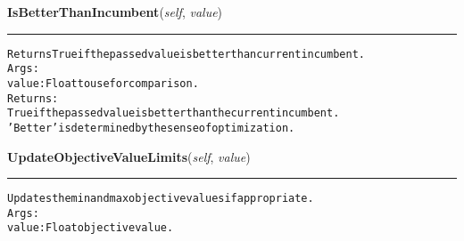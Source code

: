    \label{coinor:grumpy:BB:BBTree:IsBetterThanIncumbent}

    \vspace{0.5ex}

\hspace{.8\funcindent}\begin{boxedminipage}{\funcwidth}

    \raggedright \textbf{IsBetterThanIncumbent}(\textit{self}, \textit{value})

    \vspace{-1.5ex}

    \rule{\textwidth}{0.5\fboxrule}
\setlength{\parskip}{2ex}
\begin{alltt}

Returns True if the passed value is better than current incumbent.
Args:
  value: Float to use for comparison.
Returns:
  True if the passed value is better than the current incumbent.
  'Better' is determined by the sense of optimization.
\end{alltt}

\setlength{\parskip}{1ex}
    \end{boxedminipage}

    \label{coinor:grumpy:BB:BBTree:UpdateObjectiveValueLimits}

    \vspace{0.5ex}

\hspace{.8\funcindent}\begin{boxedminipage}{\funcwidth}

    \raggedright \textbf{UpdateObjectiveValueLimits}(\textit{self}, \textit{value})

    \vspace{-1.5ex}

    \rule{\textwidth}{0.5\fboxrule}
\setlength{\parskip}{2ex}
\begin{alltt}
Updates the min and max objective values if appropriate.
Args:
  value: Float objective value.
\end{alltt}

\setlength{\parskip}{1ex}
    \end{boxedminipage}

